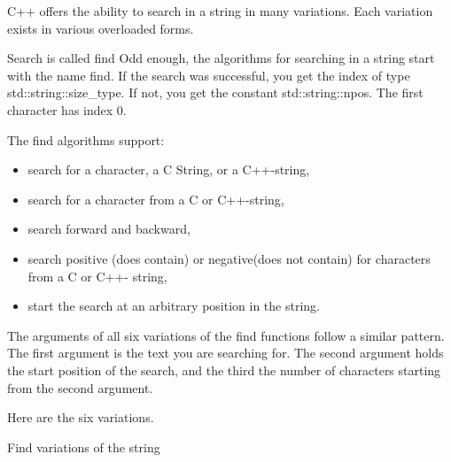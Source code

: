 
C++ offers the ability to search in a string in many variations. Each variation exists in various overloaded forms.

\begin{myTip}{Search is called find}
Odd enough, the algorithms for searching in a string start with the name find. If the search was successful, you get the index of type std::string::size\_type. If not, you get the constant std::string::npos. The first character has index 0.
\end{myTip}

The find algorithms support:

\begin{itemize}
\item 
search for a character, a C String, or a C++-string,

\item 
search for a character from a C or C++-string,

\item 
search forward and backward,

\item 
search positive (does contain) or negative(does not contain) for characters from a C or C++- string,

\item 
start the search at an arbitrary position in the string.
\end{itemize}

The arguments of all six variations of the find functions follow a similar pattern. The first argument is the text you are searching for. The second argument holds the start position of the search, and the third the number of characters starting from the second argument.

Here are the six variations.

\begin{center}
Find variations of the string
\end{center}


